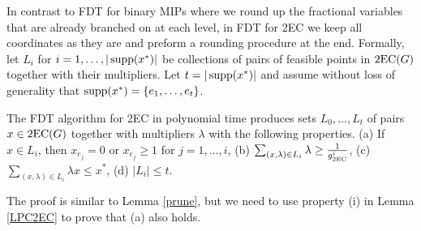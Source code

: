 \documentclass[runningheads]{llncs}
\begin{document}
In contrast to FDT for binary MIPs where we round up the fractional variables that are already branched on at each level, in FDT for 2EC we keep all coordinates as they are and preform a rounding procedure at the end. Formally, let $L_i$ for $i=1,\ldots,|\operatorname{supp}(x^*)|$ be collections of pairs of feasible points in $\operatorname{2EC}(G)$ together with their multipliers. Let $t=|\operatorname{supp}(x^*)|$ and assume without loss of generality that $\operatorname{supp}(x^*)=\{e_1,\ldots,e_t\}$. 

\begin{lemma}\label{2ecpruning}
	The FDT algorithm for 2EC in  polynomial time produces sets $L_0,\ldots,L_t$ of pairs $x\in \operatorname{2EC}(G)$ together with multipliers $\lambda$ with the following properties.
		(a) If $x\in L_i$, then $x_{e_j}=0$ or $x_{e_j}\geq 1$ for $j=1,\ldots,i$, (b) $\sum_{(x,\lambda)\in L_i }\lambda \geq \frac{1}{g_{\operatorname{2EC}}^i}$, (c) $\sum_{(x,\lambda)\in L_i }\lambda x \leq x^*$, (d) $|L_i|\leq t$.
\end{lemma}
The proof is similar to Lemma \ref{prune}, but we need to use property (i) in Lemma \ref{LPC2EC} to prove that (a) also holds.
\iffalse{
\begin{proof}
	We proceed by induction on the $i$. Define $L_0=\{(x^*,1)\}$. It is easy to check all the properties are satisfied. Now, suppose by induction we have $L_{i-1}$ for some $i=1,\ldots,t$ that satisfies all the properties. For each solution $x^\ell$ in $L_{i-1}$ apply Lemma \ref{LPC2EC} on $x^\ell$ and $e_{i}$ to obtain $x^{\ell j}$ and $\lambda_{\ell j}$ for $j=0,1,2$. Let $L'$ be the collection that contains $(x^{\ell j},\lambda_\ell \cdot \lambda_{\ell j})$ for $j=0,1,2$, when applied to all $(x^\ell,\lambda_\ell)$ in $L_{i-1}$. Similar to the proof in Lemma \ref{prune} one can check that $L_i$ satisfies properties (b), (c). We now verify property (a). Consider a solution $x^\ell$ in $L_{i-1}$. For $e\in \{e_1,\ldots,e_{i-1}\}$ if $x^\ell_e =0$, then by property (iv) in Lemma \ref{LPC2EC} we have $x^{\ell j}=0$ for $j=0,1,2$. Otherwise by induction we have $x^{\ell}_{e}\geq 1$ in which case property (v) in Lemma \ref{LPC2EC} ensures that $x^{\ell j}_e\geq 1$ for $j=0,1,2$. Also, $x^{\ell j}_{e_i}= j$, so $x^{\ell j}_{e_i}=0$ or $x^{\ell j}_{e_i}\geq 1$ for $j=0,1,2$. 
	
	If $|L'|\geq t$ we let $L_i=L'$, otherwise apply $\prun(L')$ to obtain $L_{i}$.
\end{proof}	}\fi
\end{document}
